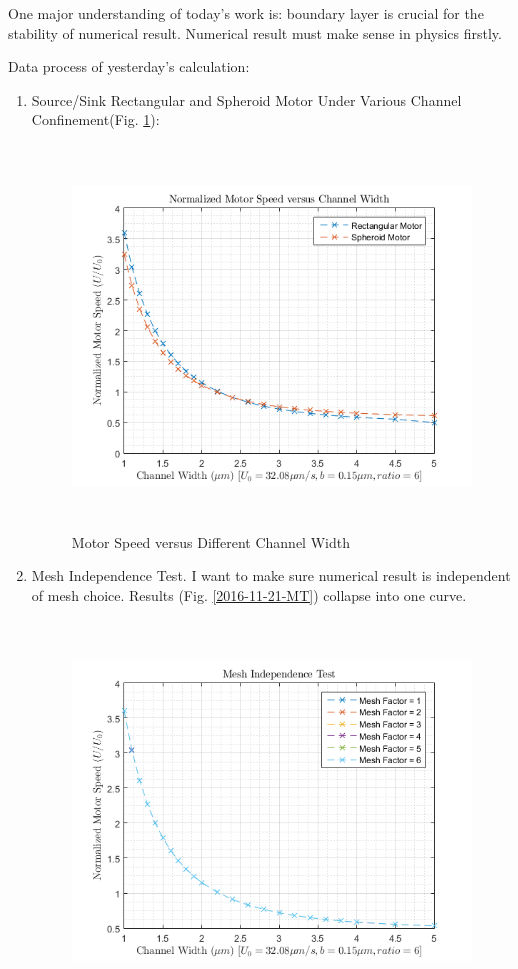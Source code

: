 \documentclass[fontsize=11pt, %
                             paper=a4, %
                             twoside, %
                             captions=tableheading,
                             index=totoc,
                             hyperref]{labbook}
\begin{document}
\begin{addmargin}[4cm]{0cm}
One major understanding of today's work is: boundary layer is crucial for the stability of numerical result. Numerical result must make sense in physics firstly.

Data process of yesterday's calculation:
\begin{enumerate}
\item
Source/Sink Rectangular and Spheroid Motor Under Various Channel Confinement(Fig. \ref{2016-11-21-MSVDCW}):
\begin{figure}
\centering
\includegraphics[width=\linewidth, height=4in]{2016-11-21-Speed-Diff-CWidth.png}
\caption{Motor Speed versus Different Channel Width}\label{2016-11-21-MSVDCW}
\end{figure}
\item
Mesh Independence Test. I want to make sure numerical result is independent of mesh choice. Results (Fig. \ref{2016-11-21-MT}) collapse into one curve.
\begin{figure}
\centering
\includegraphics[width=\linewidth, height=4in]{2016-11-21-MeshTest.png}

\end{figure}
\end{enumerate}
\end{addmargin}
\end{document}

